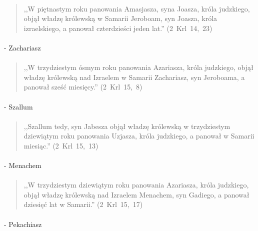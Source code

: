 \documentclass[10pt,a4paper,oneside]{article}
\begin{document}
\paragraph{}
\begin{quote}
,,W piętnastym roku panowania Amasjasza, syna Joasza, króla judzkiego, objął władzę królewską w Samarii Jeroboam, syn Joasza, króla izraelskiego, a panował czterdzieści jeden lat.'' \mbox{(2 Krl 14, 23)}
\end{quote}
\paragraph{}
- Zachariasz
\paragraph{}
\begin{quote}
,,W trzydziestym ósmym roku panowania Azariasza, króla judzkiego, objął władzę królewską nad Izraelem w Samarii Zachariasz, syn Jeroboama, a panował sześć miesięcy.'' \mbox{(2 Krl 15, 8)}
\end{quote}
\paragraph{}
- Szallum
\paragraph{}
\begin{quote}
,,Szallum tedy, syn Jabesza objął władzę królewską w trzydziestym dziewiątym roku panowania Uzjasza, króla judzkiego, a panował w Samarii miesiąc.'' \mbox{(2 Krl 15, 13)}
\end{quote}
\paragraph{}
- Menachem
\paragraph{}
\begin{quote}
,,W trzydziestym dziewiątym roku panowania Azariasza, króla judzkiego, objął władzę królewską nad Izraelem Menachem, syn Gadiego, a panował dziesięć lat w Samarii.'' \mbox{(2 Krl 15, 17)}
\end{quote}
\paragraph{}
- Pekachiasz
\end{document}
